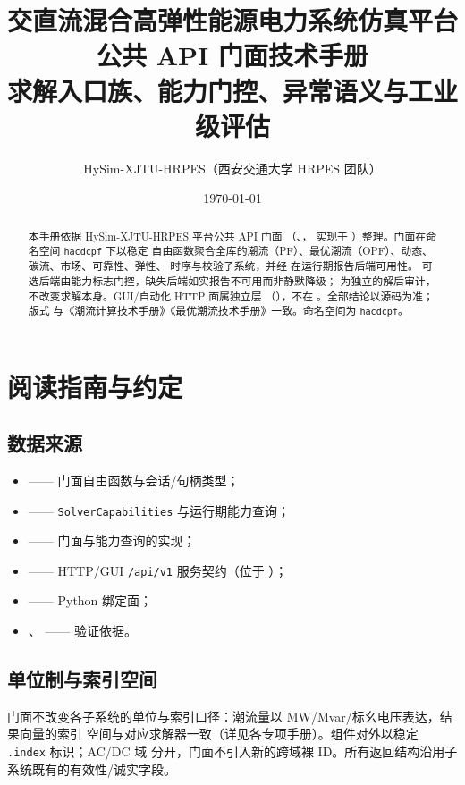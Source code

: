 \documentclass[UTF8,fontset=fandol,a4paper,11pt]{ctexart}
\title{\textbf{交直流混合高弹性能源电力系统仿真平台}\\[0.5em]
       {\Large 公共 API 门面技术手册}\\[0.3em]
       {\large 求解入口族、能力门控、异常语义与工业级评估}}
\author{HySim-XJTU-HRPES（西安交通大学 HRPES 团队）}
\date{\today}
\begin{document}
\maketitle
\begin{abstract}
\noindent 本手册依据 HySim-XJTU-HRPES 平台公共 API 门面
（、，
实现于 ）整理。门面在命名空间 \texttt{hacdcpf} 下以稳定
自由函数聚合全库的潮流（PF）、最优潮流（OPF）、动态、碳流、市场、可靠性、弹性、
时序与校验子系统，并经  在运行期报告后端可用性。
可选后端由能力标志门控，缺失后端如实报告不可用而非静默降级；
为独立的解后审计，不改变求解本身。GUI/自动化 HTTP 面属独立层
（），不在 。全部结论以源码为准；版式
与《潮流计算技术手册》《最优潮流技术手册》一致。命名空间为 \texttt{hacdcpf}。
\end{abstract}

\tableofcontents
\newpage

\section{阅读指南与约定}
\subsection{数据来源}
\begin{itemize}
  \item {} —— 门面自由函数与会话/句柄类型；
  \item {} —— \texttt{SolverCapabilities}
        与运行期能力查询；
  \item {} —— 门面与能力查询的实现；
  \item {} —— HTTP/GUI \texttt{/api/v1} 服务契约（位于
        ）；
  \item {} —— Python 绑定面；
  \item {}、
        —— 验证依据。
\end{itemize}

\subsection{单位制与索引空间}
门面不改变各子系统的单位与索引口径：潮流量以 MW/Mvar/标幺电压表达，结果向量的索引
空间与对应求解器一致（详见各专项手册）。组件对外以稳定 \texttt{.index} 标识；AC/DC 域
分开，门面不引入新的跨域裸 ID。所有返回结构沿用子系统既有的有效性/诚实字段。
\end{document}
